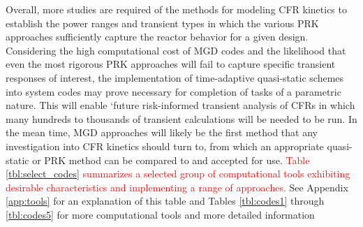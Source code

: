 \documentclass[review]{elsarticle}
\begin{document}
\par Overall, more studies are required of the methods for modeling CFR
kinetics to establish the power ranges and transient
types in which the various PRK approaches sufficiently capture the reactor
 behavior for a given design.
Considering the high computational cost of MGD codes and the likelihood 
that even the most rigorous PRK approaches will fail
to capture
specific transient responses of interest, the implementation of time-adaptive
quasi-static schemes into system codes may prove necessary for completion of tasks
of a parametric nature. This will enable `future
risk-informed transient analysis of CFRs in which many hundreds to thousands
of transient calculations will be needed to be run. In the mean time, MGD
approaches will likely be the first method that any investigation into CFR kinetics
should turn to, from which an appropriate quasi-static or PRK method can be
compared to and accepted for use. \textcolor{red}{Table \ref{tbl:select_codes} summarizes a selected group
of computational tools exhibiting desirable characteristics and implementing
a range of approaches.} See Appendix \ref{app:tools} for an explanation of this table and 
Tables \ref{tbl:codes1} through \ref{tbl:codes5} for more computational tools and more detailed information
\end{document}
